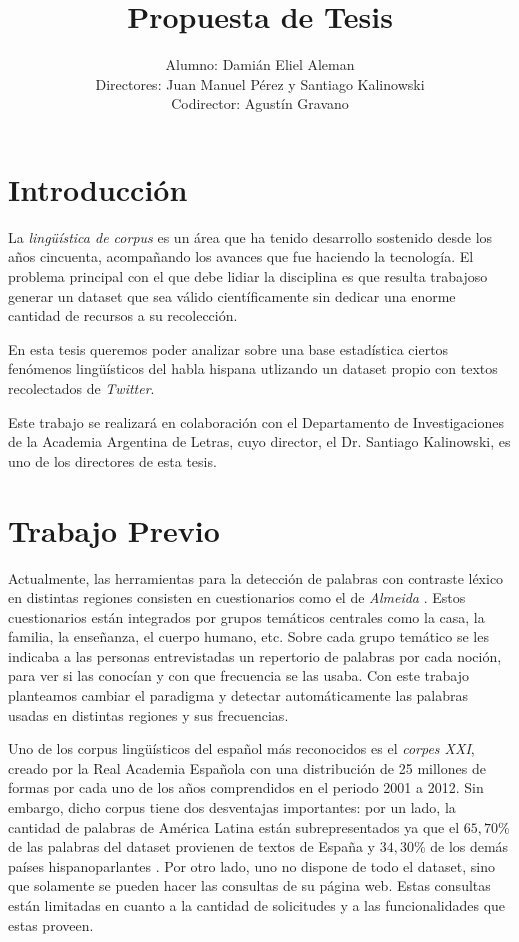 \documentclass[a4paper,11pt]{article}
\title{Propuesta de Tesis}
\author{Alumno: Damián Eliel Aleman \\
Directores: Juan Manuel Pérez y Santiago Kalinowski \\
Codirector: Agustín Gravano}
\begin{document}
\maketitle


\section*{Introducción}

La \emph{lingüística de corpus} es un área que ha tenido desarrollo sostenido desde los años cincuenta, acompañando los avances que fue haciendo la tecnología. El problema principal con el que debe lidiar la disciplina es que resulta trabajoso generar un dataset que sea válido científicamente sin dedicar una enorme cantidad de recursos a su recolección.

En esta tesis queremos poder analizar sobre una base estadística ciertos
 fenómenos lingüísticos del habla hispana utlizando un dataset propio con
 textos recolectados de \emph{Twitter}.

Este trabajo se realizará en colaboración con el Departamento de Investigaciones de la
Academia Argentina de Letras, cuyo director, el Dr. Santiago Kalinowski, es uno de los directores de esta tesis.

\section*{Trabajo Previo} 

\par Actualmente, las herramientas para la detección de palabras con contraste léxico en distintas regiones
consisten en cuestionarios como el de \emph{Almeida }\cite{ALMEIDA1995}.  Estos cuestionarios están integrados por grupos temáticos centrales como la casa, la familia, la enseñanza, el cuerpo humano, etc. Sobre cada grupo temático se les indicaba a las personas entrevistadas un repertorio de palabras por cada noción, para ver si las conocían y con que frecuencia se las usaba. 
Con este trabajo planteamos cambiar el paradigma y detectar automáticamente las palabras usadas en distintas regiones y sus frecuencias.

Uno de los corpus lingüísticos del español más reconocidos es el \emph{corpes XXI}\cite{CORPES XXI}, creado por la Real Academia Española con una distribución de 25 millones de formas por cada uno de los años comprendidos en el periodo 2001 a 2012. Sin
embargo, dicho corpus tiene dos desventajas importantes: por un
lado, la cantidad de palabras de América Latina están subrepresentados ya que el $65,70$\% de las palabras del dataset provienen de textos de España y $34,30$\% de los demás países hispanoparlantes . Por otro lado, uno no dispone de todo el dataset, sino que solamente se pueden hacer las consultas de su página web. Estas consultas están limitadas en cuanto a la cantidad de solicitudes y a las funcionalidades que estas proveen.
\end{document}
